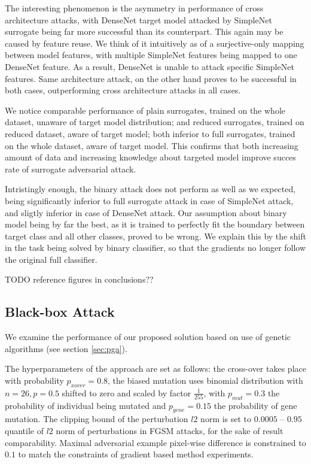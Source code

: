 The interesting phenomenon is the asymmetry in performance of cross architecture attacks, with DenseNet target model attacked by SimpleNet surrogate being far more successful than its counterpart. This again may be caused by feature reuse. We think of it intuitively as of a surjective-only mapping between model features, with multiple SimpleNet features being mapped to one DenseNet feature. As a result, DenseNet is unable to attack specific SimpleNet features. Same architecture attack, on the other hand proves to be successful in both cases, outperforming cross architecture attacks in all cases.

We notice comparable performance of plain surrogates, trained on the whole dataset, unaware of target model distribution; and reduced surrogates, trained on reduced dataset, aware of target model; both inferior to full surrogates, trained on the whole dataset, aware of target model. This confirms that both increasing amount of data and increasing knowledge about targeted model improve succes rate of surrogate adversarial attack.

Intristingly enough, the binary attack does not perform as well as we expected, being significantly inferior to full surrogate attack in case of SimpleNet attack, and sligtly inferior in case of DenseNet attack. Our assumption about binary model being by far the best, as it is trained to perfectly fit the boundary between target class and all other classes, proved to be wrong. We explain this by the shift in the task being solved by binary classifier, so that the gradients no longer follow the original full classifier.

TODO reference figures in conclusions??

\subsection{Black-box Attack}
\label{sec:blackbox_ga}
We examine the performance of our proposed solution based on use of genetic algorithms (see section \ref{sec:pga}).

The hyperparameters of the approach are set as follows: the cross-over takes place with probability $p_{xover} = 0.8$, the biased mutation uses binomial distribution with $n = 26, p = 0.5$ shifted to zero and scaled by factor $\frac{1}{255}$, with $p_{mut} = 0.3$ the probability of individual being mutated and $p_{gene} = 0.15$ the probability of gene mutation. The clipping bound of the perturbation $l2$ norm is set to $0.0005$ -- $0.95$ quantile of $l2$ norm of perturbations in FGSM attacks, for the sake of result comparability. Maximal adversarial example pixel-wise difference is constrained to $0.1$ to match the constraints of gradient based method experiments.

